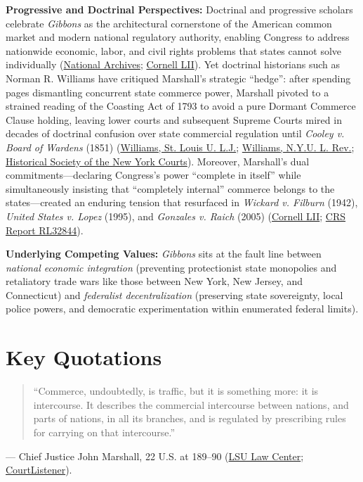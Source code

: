\documentclass[12pt]{article}
\begin{document}
\textbf{Progressive and Doctrinal Perspectives:} Doctrinal and progressive scholars celebrate \textit{Gibbons} as the architectural cornerstone of the American common market and modern national regulatory authority, enabling Congress to address nationwide economic, labor, and civil rights problems that states cannot solve individually (\href{https://www.archives.gov/milestone-documents/gibbons-v-ogden}{National Archives}; \href{https://www.law.cornell.edu/wex/enumerated_powers}{Cornell LII}). Yet doctrinal historians such as Norman R. Williams have critiqued Marshall's strategic ``hedge'': after spending pages dismantling concurrent state commerce power, Marshall pivoted to a strained reading of the Coasting Act of 1793 to avoid a pure Dormant Commerce Clause holding, leaving lower courts and subsequent Supreme Courts mired in decades of doctrinal confusion over state commercial regulation until \textit{Cooley v. Board of Wardens} (1851) (\href{https://scholarship.law.slu.edu/cgi/viewcontent.cgi?article=1753&context=lj}{Williams, St. Louis U. L.J.}; \href{https://www.nyulawreview.org/wp-content/uploads/2018/08/NYULawReview-79-4-Williams.pdf}{Williams, N.Y.U. L. Rev.}; \href{https://history.nycourts.gov/wp-content/uploads/2026/05/25_Judicial_Notice-compressed.pdf}{Historical Society of the New York Courts}). Moreover, Marshall's dual commitments---declaring Congress's power ``complete in itself'' while simultaneously insisting that ``completely internal'' commerce belongs to the states---created an enduring tension that resurfaced in \textit{Wickard v. Filburn} (1942), \textit{United States v. Lopez} (1995), and \textit{Gonzales v. Raich} (2005) (\href{https://www.law.cornell.edu/wex/enumerated_powers}{Cornell LII}; \href{https://www.everycrsreport.com/reports/RL32844.html}{CRS Report RL32844}).

\textbf{Underlying Competing Values:} \textit{Gibbons} sits at the fault line between \emph{national economic integration} (preventing protectionist state monopolies and retaliatory trade wars like those between New York, New Jersey, and Connecticut) and \emph{federalist decentralization} (preserving state sovereignty, local police powers, and democratic experimentation within enumerated federal limits).

\section{Key Quotations}
\begin{quote}
``Commerce, undoubtedly, is traffic, but it is something more: it is intercourse. It describes the commercial intercourse between nations, and parts of nations, in all its branches, and is regulated by prescribing rules for carrying on that intercourse.''
\end{quote}
\noindent --- Chief Justice John Marshall, 22 U.S. at 189--90 (\href{https://biotech.law.lsu.edu/cases/pp/Gibbons.htm}{LSU Law Center}; \href{https://www.courtlistener.com/opinion/85412/gibbons-v-ogden/}{CourtListener}).
\end{document}
